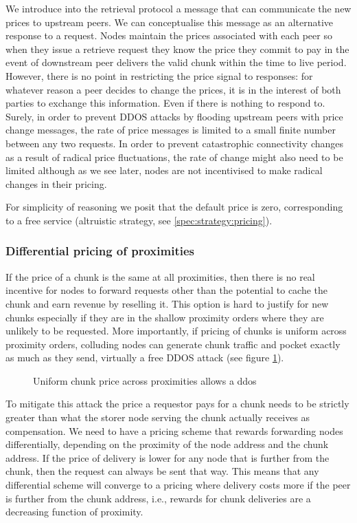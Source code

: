 We introduce into the retrieval protocol a message that can communicate the new prices to upstream peers. We can conceptualise this message as an alternative response to a request. Nodes maintain the prices associated with each peer so when they issue a retrieve request they know the price they commit to pay in the event of downstream peer delivers the valid chunk within the time to live period. However, there is no point in restricting the price signal to responses: for whatever reason a peer decides to change the prices, it is in the interest of both parties to exchange this information. Even if there is nothing to respond to. Surely, in order to prevent DDOS attacks by flooding upstream peers with price change messages, the rate of price messages is limited to a small finite number between any two requests. In order to prevent catastrophic connectivity changes as a result of radical price fluctuations, the rate of change might also need to be limited although as we see later, nodes are not incentivised to make radical changes in their pricing.

For simplicity of reasoning we posit that the default price is zero, corresponding to a free service (altruistic strategy, see \ref{spec:strategy:pricing}). 

\subsubsection{Differential pricing of proximities}

If the price of a chunk is the same at all proximities, then there is no real incentive for nodes to forward requests other than the potential to cache the chunk and earn revenue by reselling it. This option is hard to justify for new chunks especially if they are in the shallow proximity orders where they are unlikely to be requested. More importantly, if pricing of chunks is uniform across proximity orders, colluding nodes can generate chunk traffic  and pocket exactly as much as they send, virtually a free DDOS attack (see figure \ref{fig:ddos-uniform-price}).

\begin{figure}[htbp]
   \centering
   \caption{Uniform chunk price across proximities allows a ddos}
   \label{fig:ddos-uniform-price}
\end{figure}

To mitigate this attack the price a requestor pays for a chunk needs to be strictly greater than what the storer node serving the chunk actually receives as compensation. We need to have a pricing scheme that rewards forwarding nodes differentially, depending on the proximity of  the node address and the chunk address. If the price of delivery is lower for any node that is further from the chunk, then the request can always be sent that way. This means that any differential scheme will converge to a pricing where delivery costs more if the peer is further from the chunk address, i.e., rewards for chunk deliveries are a decreasing function of proximity. 

